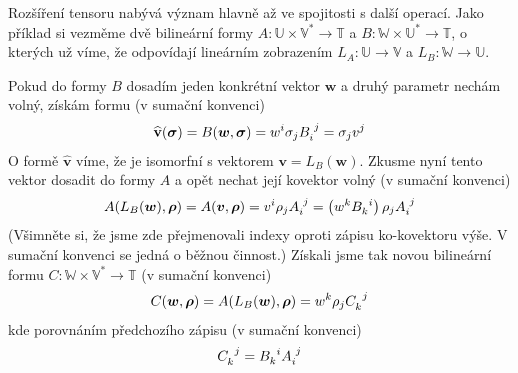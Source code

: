 \documentclass[a5paper,12pt]{amsbook}
\theoremstyle{definition}
\newcommand{\myvec}[1]{\bm{#1}}
\newcommand{\myspace}[1]{\mathbb{#1}}
\newcommand{\mycocovec}[1]{\mathbf{\widehat{#1}}}
\begin{document}
\medskip\noindent
Rozšíření tensoru nabývá význam hlavně až ve spojitosti s další operací.
Jako příklad si vezměme dvě bilineární formy $A: \myspace{U}\times\myspace{V^*}\rightarrow\myspace{T}$
a $B: \myspace{W}\times\myspace{U^*}\rightarrow\myspace{T}$, o kterých už víme, že
odpovídají lineárním zobrazením $L_A: \myspace{U}\rightarrow\myspace{V}$
a $L_B: \myspace{W}\rightarrow\myspace{U}$.

Pokud do formy $B$ dosadím jeden konkrétní vektor $\myvec{w}$ a druhý parametr nechám
volný, získám formu (v sumační konvenci)
\begin{equation*}
\begin{split}
\mycocovec{v}(\myvec{\sigma}) = B(\myvec{w}, \myvec{\sigma}) = w^i \sigma_j B\indices{_i^j}
  = \sigma_j v^j
\end{split}
\end{equation*}
O formě $\mycocovec{v}$ víme, že je isomorfní s vektorem $\myvec{v} = L_B(\myvec{w})$.
Zkusme nyní tento vektor dosadit do formy $A$ a opět nechat její kovektor volný (v sumační
konvenci)
\begin{equation*}
\begin{split}
A(L_B(\myvec{w}), \myvec{\rho})
= A(\myvec{v}, \myvec{\rho}) = v^i \rho_j A\indices{_i^j} 
= \left(w^k B\indices{_k^i}\right) \rho_j A\indices{_i^j}
\end{split}
\end{equation*}
(Všimněte si, že jsme zde přejmenovali indexy oproti zápisu ko-kovektoru výše.
V sumační konvenci se jedná o běžnou činnost.) Získali jsme tak novou bilineární
formu $C: \myspace{W}\times\myspace{V^*}\rightarrow\myspace{T}$ (v sumační konvenci)
\begin{equation*}
\begin{split}
C(\myvec{w}, \myvec{\rho}) = A(L_B(\myvec{w}), \myvec{\rho}) = w^k \rho_j C\indices{_k^j}
\end{split}
\end{equation*}
kde porovnáním předchozího zápisu (v sumační konvenci)
\begin{equation*}
\begin{split}
C\indices{_k^j} = B\indices{_k^i} A\indices{_i^j}
\end{split}
\end{equation*}
\end{document}
